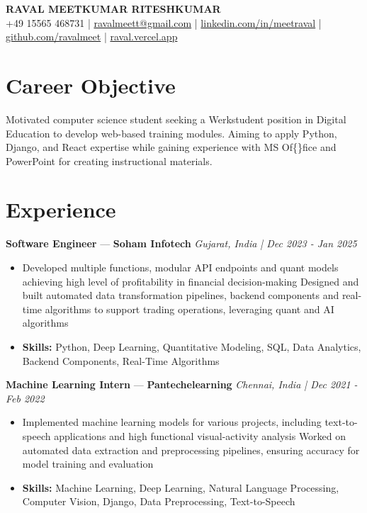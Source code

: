 \documentclass[a4paper,10pt]{article}
\begin{document}
\begin{center}
  {\Large\bfseries RAVAL MEETKUMAR RITESHKUMAR}\\[2pt]
  {\small +49 15565 468731 \;|\; \href{mailto:ravalmeett@gmail.com}{ravalmeett@gmail.com} \;|\; \href{https://www.linkedin.com/in/meetraval/}{linkedin.com/in/meetraval} \;|\; \href{https://github.com/ravalmeet}{github.com/ravalmeet} \;|\; \href{https://raval.vercel.app/}{raval.vercel.app}}
\end{center}
\vspace{-3pt}

\section*{Career Objective}
Motivated computer science student seeking a Werkstudent position in Digital Education to develop web-based training modules. Aiming to apply Python, Django, and React expertise while gaining experience with MS Of\{\}fice and PowerPoint for creating instructional materials.\par

\section*{Experience}
\textbf{Software Engineer} — \textbf{Soham Infotech} \hfill \textit{Gujarat, India \;|\; Dec 2023 - Jan 2025}\par
\vspace{1pt}
\begin{itemize}
  \item Developed multiple functions, modular API endpoints and quant models achieving high level of profitability in financial decision-making Designed and built automated data transformation pipelines, backend components and real-time algorithms to support trading operations, leveraging quant and AI algorithms
  \item \textbf{Skills:} Python, Deep Learning, Quantitative Modeling, SQL, Data Analytics, Backend Components, Real-Time Algorithms
\end{itemize}
\vspace{3pt}
\textbf{Machine Learning Intern} — \textbf{Pantechelearning} \hfill \textit{Chennai, India \;|\; Dec 2021 - Feb 2022}\par
\vspace{1pt}
\begin{itemize}
  \item Implemented machine learning models for various projects, including text-to-speech applications and high functional visual-activity analysis Worked on automated data extraction and preprocessing pipelines, ensuring accuracy for model training and evaluation
  \item \textbf{Skills:} Machine Learning, Deep Learning, Natural Language Processing, Computer Vision, Django, Data Preprocessing, Text-to-Speech
\end{itemize}
\end{document}
